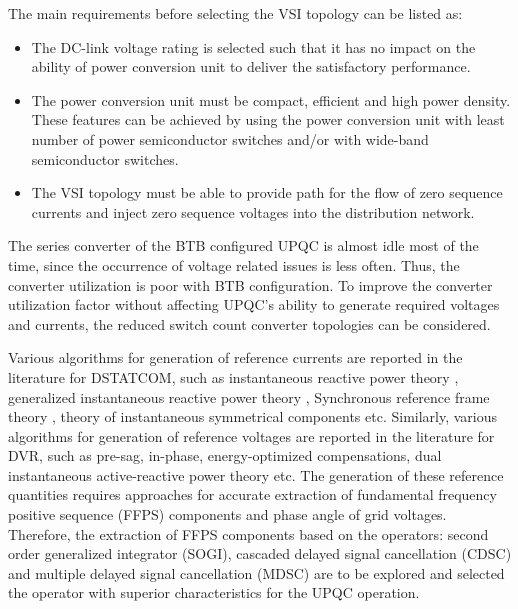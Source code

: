  The main requirements before selecting the VSI topology can be listed as:
 \begin{itemize}
 \item The DC-link voltage rating is selected such that it has no impact on the ability of power conversion unit to deliver the satisfactory performance. 
 \item The power conversion unit must be compact, efficient and high power density. These features can be achieved by using the power conversion unit with least number of power semiconductor switches and/or with wide-band semiconductor switches. 
 \item The VSI topology must be able to provide path for the flow of zero sequence currents and inject zero sequence voltages into the distribution network.
 \end{itemize}
 The series converter of the BTB configured UPQC is almost idle most of the time, since the occurrence of voltage related issues is less often. Thus, the converter utilization is poor with BTB configuration. To improve the converter utilization factor without affecting UPQC's ability to generate required voltages and currents, the reduced switch count converter topologies can be considered.
 
 Various algorithms for generation of reference currents are reported in the literature for DSTATCOM, such as instantaneous reactive power theory \cite{akagi1984instantaneous, akagi1986control}, generalized instantaneous reactive power theory \cite{akagi1983generalized,peng1996generalized}, Synchronous reference frame theory \cite{1629027}, theory of instantaneous symmetrical components \cite {ghosh2000use} etc. Similarly, various algorithms for generation of reference voltages are reported in the literature for DVR, such as pre-sag, in-phase, energy-optimized compensations, dual instantaneous active-reactive power theory \cite{6556997, 1208380, 1510825, 8400555} etc. The generation of these reference quantities requires approaches for accurate extraction of fundamental frequency positive sequence (FFPS) components and phase angle of grid voltages. Therefore, the extraction of FFPS components based on the operators: second order generalized integrator (SOGI), cascaded delayed signal cancellation (CDSC) and multiple delayed signal cancellation (MDSC) are to be explored and selected the operator with superior characteristics for the UPQC operation.    
 
